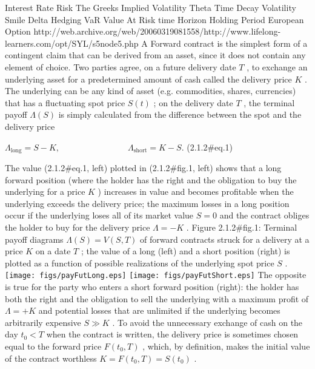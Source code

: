 \documentclass{beamer}
\begin{document}
\begin{frame}

Interest Rate Risk
The Greeks
Implied Volatility
Theta Time Decay
Volatility Smile
Delta Hedging
VaR
Value At Risk
time Horizon
Holding Period
European Option
http://web.archive.org/web/20060319081558/http://www.lifelong-learners.com/opt/SYL/s5node5.php
A Forward contract is the simplest form of a contingent claim that can be derived from an asset, since it does not contain any element of choice. Two parties agree, on a future delivery date $ T$ , to exchange an underlying asset for a predetermined amount of cash called the delivery price $ K$ . The underlying can be any kind of asset (e.g. commodities, shares, currencies) that has a fluctuating spot price $ S(t)$ ; on the delivery date $ T$ , the terminal payoff $ \Lambda (S)$ is simply calculated from the difference between the spot and the delivery price

 $\displaystyle \Lambda_\mathrm{long}=S-K, \qquad\qquad\qquad\qquad \Lambda_\mathrm{short}=K-S.$	 (2.1.2#eq.1)

The value (2.1.2#eq.1, left) plotted in (2.1.2#fig.1, left) shows that a long forward position (where the holder has the right and the obligation to buy the underlying for a price $ K$ ) increases in value and becomes profitable when the underlying exceeds the delivery price; the maximum losses in a long position occur if the underlying loses all of its market value $ S=0$ and the contract obliges the holder to buy for the delivery price  $ \Lambda=-K$ .
Figure 2.1.2#fig.1: Terminal payoff diagrams  $ \Lambda (S)=V(S,T)$ of forward contracts struck for a delivery at a price $ K$ on a date $ T$ ; the value of a long (left) and a short position (right) is plotted as a function of possible realizations of the underlying spot price $ S$ .
\texttt{[image: figs/payFutLong.eps]}        \texttt{[image: figs/payFutShort.eps]}
The opposite is true for the party who enters a short forward position (right): the holder has both the right and the obligation to sell the underlying with a maximum profit of  $ \Lambda=+K$ and potential losses that are unlimited if the underlying becomes arbitrarily expensive $ S\gg K$ . To avoid the unnecessary exchange of cash on the day $ t_0<T$ when the contract is written, the delivery price is sometimes chosen equal to the forward price $ F(t_0,T)$ , which, by definition, makes the initial value of the contract worthless  $ K=F(t_0,T)=S(t_0)$ .


\end{frame}
\end{document}
